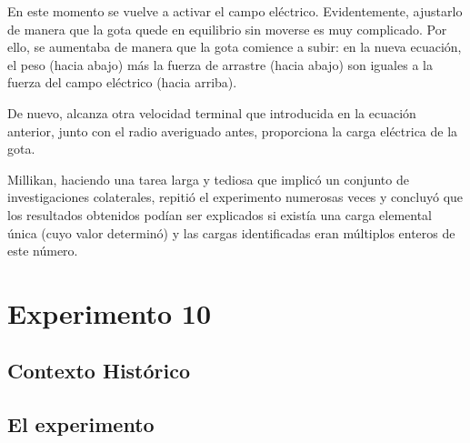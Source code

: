 \documentclass[journal]{IEEEtran}
\begin{document}
En este momento se vuelve a activar el campo eléctrico. Evidentemente, ajustarlo de manera que la gota quede en equilibrio sin moverse es muy complicado. Por ello, se aumentaba de manera que la gota comience a subir: en la nueva ecuación, el peso (hacia abajo) más la fuerza de arrastre (hacia abajo) son iguales a la fuerza del campo eléctrico (hacia arriba).

De nuevo, alcanza otra velocidad terminal que introducida en la ecuación anterior, junto con el radio averiguado antes, proporciona la carga eléctrica de la gota.

Millikan, haciendo una tarea larga y tediosa que implicó un conjunto de investigaciones colaterales, repitió el experimento numerosas veces y concluyó que los resultados obtenidos podían ser explicados si existía una carga elemental única (cuyo valor determinó) y las cargas identificadas eran múltiplos enteros de este número.
















\section{Experimento 10}

\subsection{Contexto Histórico}

\subsection{El experimento}










\end{document}
